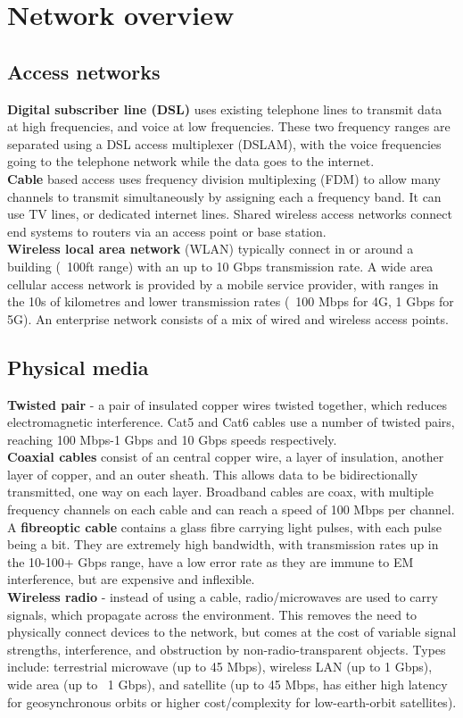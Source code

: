 \section{Network overview}
\subsection{Access networks}
\textbf{Digital subscriber line (DSL)} uses existing telephone lines to transmit data at high frequencies, and voice at low frequencies. These two frequency ranges are separated using a DSL access multiplexer (DSLAM), with the voice frequencies going to the telephone network while the data goes to the internet. \\
\textbf{Cable} based access uses frequency division multiplexing (FDM) to allow many channels to transmit simultaneously by assigning each a frequency band. It can use TV lines, or dedicated internet lines. Shared wireless access networks connect end systems to routers via an access point or base station.\\
\textbf{Wireless local area network} (WLAN) typically connect in or around a building (~100ft range) with an up to 10 Gbps transmission rate. A wide area cellular access network is provided by a mobile service provider, with ranges in the 10s of kilometres and lower transmission rates (~100 Mbps for 4G, 1 Gbps for 5G). An enterprise network consists of a mix of wired and wireless access points.
\subsection{Physical media}
\textbf{Twisted pair} - a pair of insulated copper wires twisted together, which reduces electromagnetic interference. Cat5 and Cat6 cables use a number of twisted pairs, reaching 100 Mbps-1 Gbps and 10 Gbps speeds respectively.\\
\textbf{Coaxial cables} consist of an central copper wire, a layer of insulation, another layer of copper, and an outer sheath. This allows data to be bidirectionally transmitted, one way on each layer. Broadband cables are coax, with multiple frequency channels on each cable and can reach a speed of 100 Mbps per channel.\\
A \textbf{fibreoptic cable} contains a glass fibre carrying light pulses, with each pulse being a bit. They are extremely high bandwidth, with transmission rates up in the 10-100+ Gbps range, have a low error rate as they are immune to EM interference, but are expensive and inflexible.\\
\textbf{Wireless radio} - instead of using a cable, radio/microwaves are used to carry signals, which propagate across the environment. This removes the need to physically connect devices to the network, but comes at the cost of variable signal strengths, interference, and obstruction by non-radio-transparent objects. Types include: terrestrial microwave (up to 45 Mbps), wireless LAN (up to 1 Gbps), wide area (up to ~1 Gbps), and satellite (up to 45 Mbps, has either high latency for geosynchronous orbits or higher cost/complexity for low-earth-orbit satellites).
